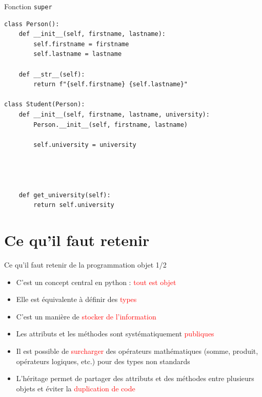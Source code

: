 \documentclass[10pt]{beamer}
\begin{document}
\begin{frame}[fragile]{Fonction \texttt{super}}
\begin{lstlisting}[numbers=none, morekeywords={Person, super}]
class Person():
    def __init__(self, firstname, lastname):
        self.firstname = firstname
        self.lastname = lastname

    def __str__(self):
        return f"{self.firstname} {self.lastname}"

class Student(Person):
    def __init__(self, firstname, lastname, university):
        Person.__init__(self, firstname, lastname)

        self.university = university        
    



    def get_university(self):
        return self.university
\end{lstlisting}
  \end{frame}


\section{Ce qu'il faut retenir}

\begin{frame}{Ce qu'il faut retenir de la programmation objet 1/2}

  \begin{itemize}
    \item C'est un concept central en python : \textcolor{red}{tout est objet}
    \item Elle est équivalente à définir des \textcolor{red}{types}
    \item C'est un manière de \textcolor{red}{stocker de l'information}
    \item Les attributs et les méthodes sont systématiquement \textcolor{red}{publiques}
    \item Il est possible de \textcolor{red}{surcharger} des opérateurs mathématiques (somme, produit, opérateurs logiques, etc.) pour des types non standards
    \item L'héritage permet de partager des attributs et des méthodes entre plusieurs objets et éviter la \textcolor{red}{duplication de code}
  \end{itemize}
\end{frame}
\end{document}
